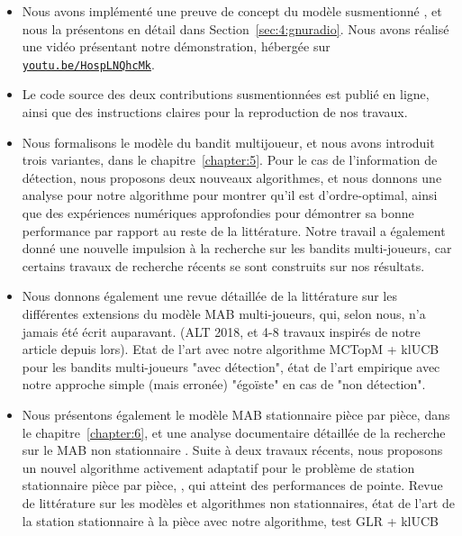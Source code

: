 \begin{resume_fr}
\begin{itemize}
    \item
    Nous avons implémenté une preuve de concept du modèle susmentionné \cite{Besson2018ICT}, et nous la présentons en détail dans Section~\ref{sec:4:gnuradio}. Nous avons réalisé une vidéo présentant notre démonstration, hébergée sur \texttt{\href{https://youtu.be/HospLNQhcMk}{youtu.be/HospLNQhcMk}}.

    \item
    Le code source des deux contributions susmentionnées est publié en ligne, ainsi que des instructions claires pour la reproduction de nos travaux.

    \item
    Nous formalisons le modèle du bandit multijoueur, et nous avons introduit trois variantes, dans le chapitre~\ref{chapter:5}.
    Pour le cas de l'information de détection, nous proposons deux nouveaux algorithmes, et nous donnons une analyse pour notre algorithme \MCTopM{} pour montrer qu'il est d'ordre-optimal,
    ainsi que des expériences numériques approfondies pour démontrer sa bonne performance par rapport au reste de la littérature.
    Notre travail \cite{Besson2018ALT} a également donné une nouvelle impulsion à la recherche sur les bandits multi-joueurs, car certains travaux de recherche récents se sont construits sur nos résultats.

    \item
    Nous donnons également une revue détaillée de la littérature sur les différentes extensions du modèle MAB multi-joueurs, qui, selon nous, n'a jamais été écrit auparavant.
    (ALT 2018, et 4-8 travaux inspirés de notre article depuis lors). Etat de l'art avec notre algorithme MCTopM + klUCB pour les bandits multi-joueurs "avec détection", état de l'art empirique avec notre approche simple (mais erronée) "égoïste" en cas de "non détection".

    \item
    Nous présentons également le modèle MAB stationnaire pièce par pièce, dans le chapitre~\ref{chapter:6}, et une analyse documentaire détaillée de la recherche sur le MAB non stationnaire \cite{Besson2019GLRT,Besson2019Gretsi}.
    Suite à deux travaux récents, nous proposons un nouvel algorithme activement adaptatif pour le problème de station stationnaire pièce par pièce, \GLRklUCB, qui atteint des performances de pointe.
    Revue de littérature sur les modèles et algorithmes non stationnaires, état de l'art de la station stationnaire à la pièce avec notre algorithme, test GLR + klUCB


\end{itemize}
\end{resume_fr}
